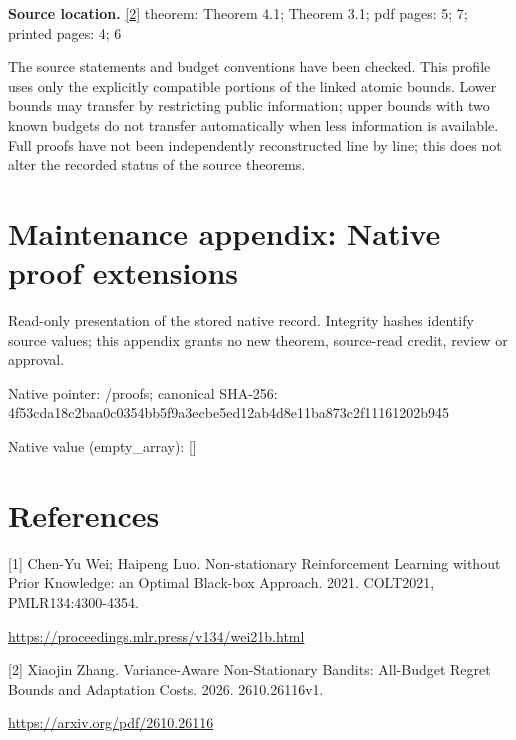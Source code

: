 \documentclass[10pt,a4paper]{article}
\begin{document}
\textbf{Source location.} \href{https://arxiv.org/pdf/2610.26116}{[2]} theorem: Theorem 4.1; Theorem 3.1; pdf pages: 5; 7; printed pages: 4; 6



The source statements and budget conventions have been checked. This profile uses only the explicitly compatible portions of the linked atomic bounds. Lower bounds may transfer by restricting public information; upper bounds with two known budgets do not transfer automatically when less information is available. Full proofs have not been independently reconstructed line by line; this does not alter the recorded status of the source theorems.



\section{Maintenance appendix: Native proof extensions}


Read-only presentation of the stored native record. Integrity hashes identify source values; this appendix grants no new theorem, source-read credit, review or approval.



Native pointer: /proofs; canonical SHA-256: 4f53cda18c2baa0c0354bb5f\allowbreak{}9a3ecbe5ed12ab4d8e11ba87\allowbreak{}3c2f11161202b945



Native value (empty\_array): []



\section{References}


[1] Chen-Yu Wei; Haipeng Luo. Non-stationary Reinforcement Learning without Prior Knowledge: an Optimal Black-box Approach. 2021. COLT2021, PMLR134:4300-4354.



\url{https://proceedings.mlr.press/v134/wei21b.html}



[2] Xiaojin Zhang. Variance-Aware Non-Stationary Bandits: All-Budget Regret Bounds and Adaptation Costs. 2026. 2610.26116v1.



\url{https://arxiv.org/pdf/2610.26116}
\end{document}
